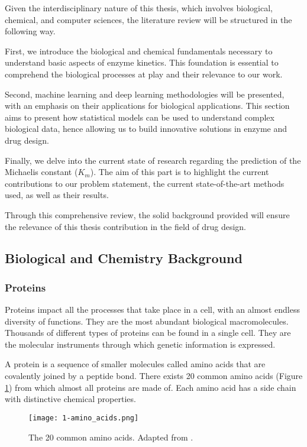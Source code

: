Given the interdisciplinary nature of this thesis, which involves biological, chemical, and computer sciences, the literature review will be structured in the following way.

First, we introduce the biological and chemical fundamentals necessary to understand basic aspects of enzyme kinetics. This foundation is essential to comprehend the biological processes at play and their relevance to our work.

Second, machine learning and deep learning methodologies will be presented, with an emphasis on their applications for biological applications. This section aims to present how statistical models can be used to understand complex biological data, hence allowing us to build innovative solutions in enzyme and drug design.

Finally, we delve into the current state of research regarding the prediction of the Michaelis 
constant ($K_m$). The aim of this part is to highlight the current contributions to 
our problem statement, the current state-of-the-art methods used, as well as their results.

Through this comprehensive review, the solid background provided will ensure the relevance of this thesis
contribution in the field of drug design.

\subsection{Biological and Chemistry Background}
\subsubsection{Proteins}
Proteins impact all the processes that take place in a cell, with an almost
endless diversity of functions. They are the most abundant biological macromolecules.
Thousands of different types of proteins can be found in a single cell. They are the molecular
instruments through which genetic information is expressed.\cite{lehninger}

A protein is a sequence of smaller molecules called amino acids that are covalently joined by a peptide
bond. There exists 20 common amino acids (Figure \ref{fig:20aa}) from which almost all proteins are made of. Each amino acid has a side chain with distinctive chemical properties.

\begin{figure}
  \centering
  \texttt{[image: 1-amino\_acids.png]}
  \caption{The 20 common amino acids. Adapted from \citeauthor{BYJUsAminoAcids}.}
  \label{fig:20aa}
\end{figure}

